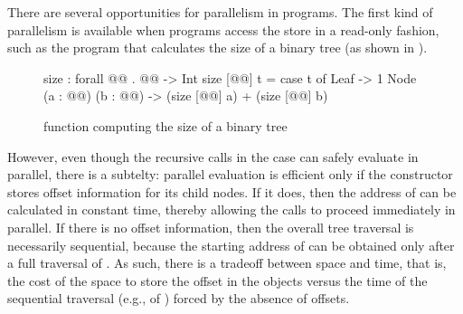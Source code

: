 
There are several opportunities for parallelism in \ourcalc{} programs.
%
The first kind of parallelism is available when \ourcalc{} programs access
the store in a read-only fashion, such as the program that calculates
the size of a binary tree (as shown in ).
\begin{figure}
\begin{code}
size : forall @@ . @@ -> Int
size [@@] t = case t of
              Leaf -> 1
              Node (a : @@) (b : @@)
               -> (size [@@] a) + (size [@@] b)
\end{code}
\caption{\ourcalc{} function computing the size of a binary tree}\label{fig:sizefunc}
\end{figure}
%
However, even though the recursive calls in the  case can
safely evaluate in parallel, there is a subtelty: parallel evaluation
is efficient only if the  constructor stores offset
information for its child nodes.
%
If it does, then the address of  can be calculated in constant
time, thereby allowing the calls to proceed immediately in parallel.
%
If there is no offset information, then the overall tree traversal is
necessarily sequential, because the starting address of  can be
obtained only after a full traversal of .
%
As such, there is a tradeoff between space and time, that is, the cost
of the space to store the offset in the  objects versus the
time of the sequential traversal (e.g., of ) forced by the
absence of offsets.

